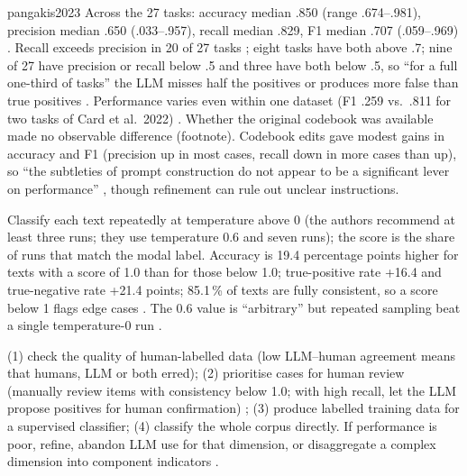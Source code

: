\begin{papercard}{pangakis2023}
 Across the 27 tasks: accuracy median .850 (range .674--.981), precision median .650 (.033--.957), recall median .829, F1 median .707 (.059--.969) . Recall exceeds precision in 20 of 27 tasks ; eight tasks have both above .7; nine of 27 have precision or recall below .5 and three have both below .5, so ``for a full one-third of tasks'' the LLM misses half the positives or produces more false than true positives . Performance varies even within one dataset (F1 .259 vs.\ .811 for two tasks of Card et al.\ 2022) . Whether the original codebook was available made no observable difference (footnote). Codebook edits gave modest gains in accuracy and F1 (precision up in most cases, recall down in more cases than up), so ``the subtleties of prompt construction do not appear to be a significant lever on performance'' , though refinement can rule out unclear instructions.

 Classify each text repeatedly at temperature above 0 (the authors recommend at least three runs; they use temperature 0.6 and seven runs); the score is the share of runs that match the modal label. Accuracy is 19.4 percentage points higher for texts with a score of 1.0 than for those below 1.0; true-positive rate +16.4 and true-negative rate +21.4 points; 85.1\,\% of texts are fully consistent, so a score below 1 flags edge cases . The 0.6 value is ``arbitrary'' but repeated sampling beat a single temperature-0 run .

 (1) check the quality of human-labelled data (low LLM--human agreement means that humans, LLM or both erred); (2) prioritise cases for human review (manually review items with consistency below 1.0; with high recall, let the LLM propose positives for human confirmation) ; (3) produce labelled training data for a supervised classifier; (4) classify the whole corpus directly. If performance is poor, refine, abandon LLM use for that dimension, or disaggregate a complex dimension into component indicators .


\end{papercard}
